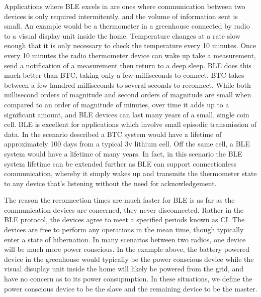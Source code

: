 \documentclass[]{article}
\begin{document}
Applications where \ac{BLE} excels in are ones where communication between two devices is only required intermitently, and the volume of information sent is small. An example would be a thermometer in a greenhouse connected by radio to a visual display unit inside the home. Temperature changes at a rate slow enough that it is only necessary to check the temperature every 10 minutes. Once every 10 minutes the radio thermometer device can wake up take a measurement, send a notification of a measurement then return to a deep sleep. \ac{BLE} does this much better than \ac{BTC}, taking only a few milliseconds to connect. \ac{BTC} takes between a few hundred milliseconds to several seconds to reconnect. While both millisecond orders of magnitude and second orders of magnitude are small when compared to an order of magnitude of minutes, over time it adds up to a significant amount, and \ac{BLE} devices can last many years of a small, single coin cell. \ac{BLE} is excellent for applications which involve small episodic transmission of data. In the scenario described a \ac{BTC} system would have a lifetime of approximately 100 days from a typical 3v lithium cell. Off the same cell, a \ac{BLE} system would have a lifetime of many years. In fact, in this scenario the \ac{BLE} system lifetime can be extended further as \ac{BLE} can support connectionless communication, whereby it simply wakes up and transmits the thermometer state to any device that's listening without the need for acknowledgement.

The reason the reconnection times are much faster for \ac{BLE} is as far as the communication devices are concerned, they never disconnected. Rather in the \ac{BLE} protocol, the devices agree to meet a specified periods known as \ac{CI}. The devices are free to perform any operations in the mean time, though typically enter a state of hibernation. In many scenarios between two radios, one device will be much more power conscious. In the example above, the battery powered device in the greenhouse would typically be the power conscious device while the visual disuplay unit inside the home will likely be powered from the grid, and have no concern as to its power consupmption. In these situations, we define the power conscious device to be the slave and the remaining device to be the master. 
\end{document}
